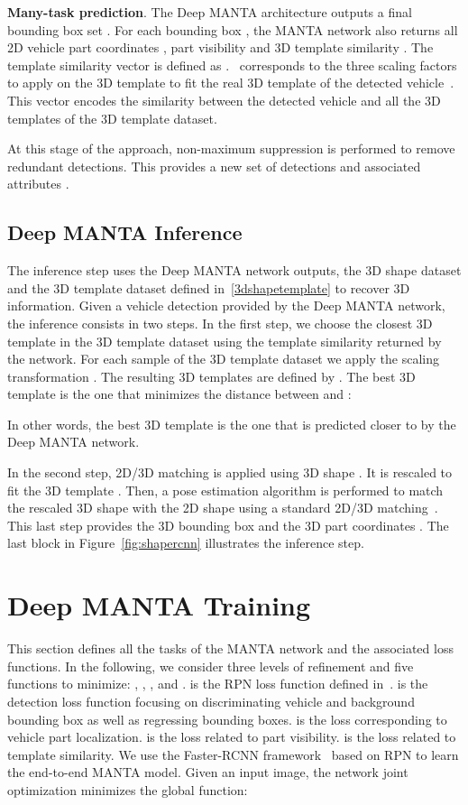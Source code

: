 \documentclass[10pt,twocolumn,letterpaper]{article}
\begin{document}
\textbf{Many-task prediction}. The Deep MANTA architecture outputs a final bounding box set . For each bounding box , the MANTA network also returns all 2D vehicle part coordinates , part visibility  and 3D template similarity . The template similarity vector  is defined as .~ corresponds to the three scaling factors to apply on the 3D template  to fit the real 3D template of the detected vehicle~. This vector encodes the similarity between the detected vehicle and all the 3D templates   of the 3D template dataset. 

At this stage of the approach, non-maximum suppression is performed to remove redundant detections. This provides a new set of  detections and associated attributes .

\subsection{Deep MANTA Inference}
\label{Inference}

The inference step uses the Deep MANTA network outputs, the 3D shape dataset  and the 3D template dataset  defined in~\ref{3dshapetemplate} to recover 3D information. Given a vehicle detection  provided by the Deep MANTA network, the inference consists in two steps. In the first step, we choose the closest 3D template  in the 3D template dataset  using the template similarity  returned by the network. For each sample  of the 3D template dataset we apply the scaling transformation . The resulting 3D templates are defined by . The best 3D template  is the one that minimizes the distance between  and :

In other words, the best 3D template is the one that is predicted closer to  by the Deep MANTA network.

In the second step, 2D/3D matching is applied using 3D shape . It is rescaled to fit the 3D template . Then, a pose estimation algorithm is performed to match the rescaled 3D shape  with the 2D shape  using a standard 2D/3D matching~\cite{epnp}. This last step provides the 3D bounding box  and the 3D part coordinates . The last block in Figure~\ref{fig:shapercnn} illustrates the inference step.

\section{Deep MANTA Training}

This section defines all the tasks of the MANTA network and the associated loss functions.
In the following, we consider three levels of refinement  and five functions to minimize: , , ,  and .  is the RPN loss function defined in~\cite{faster}.  is the detection loss function focusing on discriminating vehicle and background bounding box as well as regressing bounding boxes.  is the loss corresponding to vehicle part localization.  is the loss related to part visibility.  is the loss related to template similarity. We use the Faster-RCNN framework~\cite{faster} based on RPN to learn the end-to-end MANTA model. Given an input image, the network joint optimization minimizes the global function:
\end{document}
